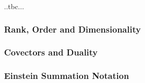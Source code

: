 
..tbc...



\subsubsection{Rank, Order and Dimensionality}


\subsubsection{Covectors and Duality}


\subsubsection{Einstein Summation Notation}
%

